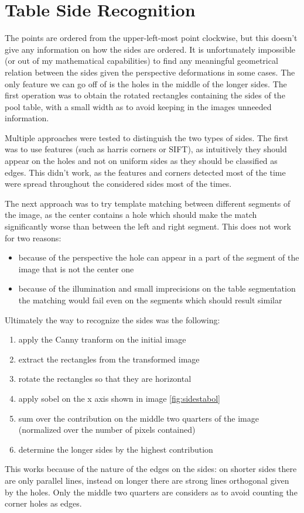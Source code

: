 \section{Table Side Recognition}

The points are ordered from the upper-left-most point clockwise, but this doesn't give
any information on how the sides are ordered. It is unfortunately impossible (or out of my
mathematical capabilities) to find any meaningful geometrical relation between the sides
given the perspective deformations in some cases. The only feature we can go off of is the 
holes in the middle of the longer sides. The first operation was to obtain the rotated
rectangles containing the sides of the pool table, with a small width as to avoid 
keeping in the images unneeded information.\par 
Multiple approaches were tested to distinguish the two types of sides. The first was 
to use features (such as harris corners or SIFT), as intuitively they should appear 
on the holes and not on uniform sides as they should be classified as edges. This didn't
work, as the features and corners detected most of the time were spread throughout the 
considered sides most of the times.\par
The next approach was to try template matching between different segments of the image,
as the center contains a hole which should make the match significantly worse than
between the left and right segment. This does not work for two reasons:
\begin{itemize}
    \item because of the perspective the hole can appear in a part of the segment of the image that is not the center one
    \item because of the illumination and small imprecisions on the table segmentation the matching would fail even on the segments which should result similar
\end{itemize}
\par
Ultimately the way to recognize the sides was the following:
\begin{enumerate}
    \item apply the Canny tranform on the initial image
    \item extract the rectangles from the transformed image
    \item rotate the rectangles so that they are horizontal
    \item apply sobel on the x axis shown in image \ref{fig:sidestabol}
    \item sum over the contribution on the middle two quarters of the image (normalized over the number of pixels contained)
    \item determine the longer sides by the highest contribution
\end{enumerate}
This works because of the nature of the edges on the sides: on shorter sides there
are only parallel lines, instead on longer there are strong lines orthogonal given by the holes.
Only the middle two quarters are considers as to avoid counting the corner holes as edges.

